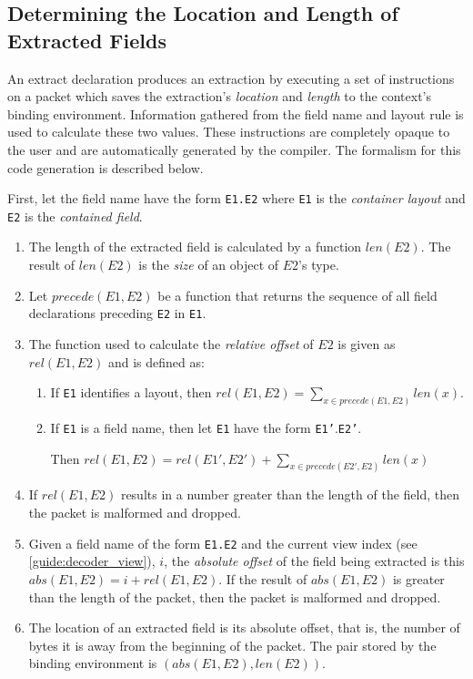 \subsection{Determining the Location and Length of Extracted Fields}

An extract declaration produces an extraction by executing a set of instructions on a packet which saves the extraction's \textit{location} and \textit{length} to the context's binding environment. Information gathered from the field name and layout rule is used to calculate these two values. These instructions are completely opaque to the user and are automatically generated by the compiler. The formalism for this code generation is described below.

First, let the field name have the form \texttt{E1.E2} where \texttt{E1} is the \textit{container layout} and \texttt{E2} is the \textit{contained field}.

\begin{enumerate}
\item The length of the extracted field is calculated by a function $len(E2)$. The result of $len(E2)$ is the \textit{size} of an object of $E2$'s type.

\item  Let $precede(E1, E2)$ be a function that returns the sequence of all field declarations preceding \texttt{E2} in \texttt{E1}. 

\item The function used to calculate the \textit{relative offset} of $E2$ is given as $rel(E1, E2)$ and is defined as:

\begin{enumerate}

\item If \texttt{E1} identifies a layout, then $rel(E1, E2) = \sum_{x \in precede(E1,E2)}{} len(x)$.

\item If \texttt{E1} is a field name, then let \texttt{E1} have the form \texttt{E1'}.\texttt{E2'}.

Then $rel(E1, E2)=rel(E1', E2') + \sum_{x \in precede(E2',E2)}{} len(x)$

\end{enumerate}

\item If $rel(E1, E2)$ results in a number greater than the length of the field, then the packet is malformed and dropped.

\item Given a field name of the form \texttt{E1.E2} and the current view index (see \ref{guide:decoder_view}), $i$, the \textit{absolute offset} of the field being extracted is this $abs(E1, E2) = i + rel(E1, E2)$.
If the result of $abs(E1, E2)$ is greater than the length of the packet, then the packet is malformed and dropped.

\item The location of an extracted field is its absolute offset, that is, the number of bytes it is away from the beginning of the packet. The pair stored by the binding environment is $(abs(E1, E2), len(E2))$.

\end{enumerate}

